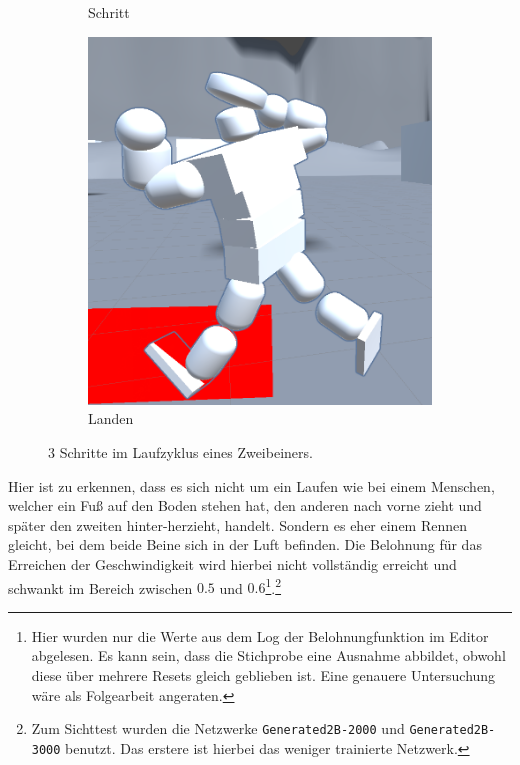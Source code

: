 \begin{figure}
\begin{subfigure}[b]{0.3\textwidth}
		\caption{Schritt}
		\label{fig:Laufen2}
	\end{subfigure}
	\hfill
	\begin{subfigure}[b]{0.3\textwidth}
		\centering
		\includegraphics[width=\textwidth]{resources/img/Unity3}
		\caption{Landen}
		\label{fig:Laufen3}
	\end{subfigure}
	\caption{3 Schritte im Laufzyklus eines Zweibeiners.}
	\label{fig:2BLaufen}
\end{figure}

Hier ist zu erkennen, dass es sich nicht um ein Laufen wie bei einem Menschen, welcher ein Fuß auf den Boden stehen hat, den anderen nach vorne zieht und später den zweiten hinter-herzieht, handelt. Sondern es eher einem Rennen gleicht, bei dem beide Beine sich in der Luft befinden. Die Belohnung für das Erreichen der Geschwindigkeit wird hierbei nicht vollständig erreicht und schwankt im Bereich zwischen $0.5$ und $0.6$\footnote{Hier wurden nur die Werte aus dem Log der Belohnungfunktion im Editor abgelesen. Es kann sein, dass die Stichprobe eine Ausnahme abbildet, obwohl diese über mehrere Resets gleich geblieben ist. Eine genauere Untersuchung wäre als Folgearbeit angeraten.}.\footnote{Zum Sichttest wurden die Netzwerke \texttt{Generated2B-2000} und \texttt{Generated2B-3000} benutzt. Das erstere ist hierbei das weniger trainierte Netzwerk.} 

